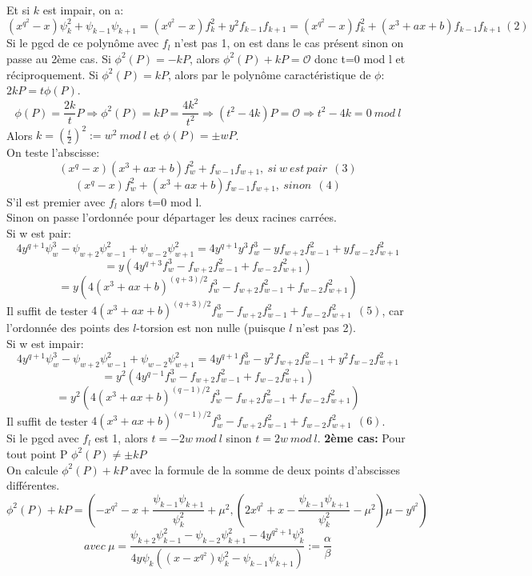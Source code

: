 \documentclass[letterpaper, 12pt]{article}
\begin{document}
Et si $k$ est impair, on a:
$$ (x^{q^2}-x)\psi_{k}^2+\psi_{k-1}\psi_{k+1} = (x^{q^2}-x)f_{k}^2+y^2f_{k-1}f_{k+1} = (x^{q^2}-x)f_{k}^2+(x^3+ax+b)f_{k-1}f_{k+1}\ (2) $$
Si le pgcd de ce polynôme avec $f_{l}$ n'est pas 1, on est dans le cas présent sinon on passe au 2ème cas.
\newline
\newline
Si $\phi^2(P)=-kP$, alors $\phi^2(P)+kP = \mathcal{O}$ donc t=0 mod l et réciproquement.
\newline
\newline
Si $\phi^2(P)=kP$, alors par le polynôme caractéristique de $\phi$: $2kP = t \phi(P).$
$$\phi(P) = \frac{2k}{t}P \Rightarrow \phi^2(P) = kP = \frac{4k^2}{t^2} \Rightarrow (t^2-4k)P = \mathcal{O} \Rightarrow t^2-4k = 0\ mod\ l $$
Alors $k = ( \frac{t}{2} )^2 := w^2\ mod\ l $ et $\phi(P) = \pm wP$.\\
On teste l'abscisse:
$$ (x^{q}-x)(x^3+ax+b)f_{w}^2+f_{w-1}f_{w+1},\ si\ w\ est\ pair\ \ (3) $$
$$ (x^{q}-x)f_{w}^2+(x^3+ax+b)f_{w-1}f_{w+1},\ sinon\ \ (4) $$
S'il est premier avec $f_{l}$ alors t=0 mod l.\\
Sinon on passe l'ordonnée pour départager les deux racines carrées.\\
Si w est pair:
$$ 4y^{q+1}\psi_{w}^3-\psi_{w+2}\psi_{w-1}^2+\psi_{w-2}\psi_{w+1}^2 = 4y^{q+1}y^3 f_{w}^3-yf_{w+2}f_{w-1}^2+yf_{w-2}f_{w+1}^2 $$ $$ = y(4y^{q+3}f_{w}^3-f_{w+2}f_{w-1}^2+f_{w-2}f_{w+1}^2) $$ $$ = y(4(x^3+ax+b)^{(q+3)/2}f_{w}^3-f_{w+2}f_{w-1}^2+f_{w-2}f_{w+1}^2) $$
Il suffit de tester $ 4(x^3+ax+b)^{(q+3)/2}f_{w}^3-f_{w+2}f_{w-1}^2+f_{w-2}f_{w+1}^2\ \ (5) $, car l'ordonnée des points des $l$-torsion est non nulle (puisque $l$ n'est pas 2).\\
Si w est impair:
$$ 4y^{q+1}\psi_{w}^3-\psi_{w+2}\psi_{w-1}^2+\psi_{w-2}\psi_{w+1}^2 = 4y^{q+1}f_{w}^3-y^2f_{w+2}f_{w-1}^2+y^2f_{w-2}f_{w+1}^2 $$ $$ = y^2(4y^{q-1}f_{w}^3-f_{w+2}f_{w-1}^2+f_{w-2}f_{w+1}^2) $$ $$ = y^2(4(x^3+ax+b)^{(q-1)/2}f_{w}^3-f_{w+2}f_{w-1}^2+f_{w-2}f_{w+1}^2) $$
Il suffit de tester $ 4(x^3+ax+b)^{(q-1)/2}f_{w}^3-f_{w+2}f_{w-1}^2+f_{w-2}f_{w+1}^2\ \ (6) $.\\
Si le pgcd avec $f_l$ est 1, alors $ t=-2w\ mod\ l$ sinon $ t=2w\ mod\ l $.
\newline
\newline
\textbf{2ème cas:} Pour tout point P $\phi^2(P) \neq \pm kP$\\
On calcule $\phi^2(P)+kP$ avec la formule de la somme de deux points d'abscisses différentes.
$$ \phi^2(P)+kP = \left(-x^{q^2}-x+\frac{\psi_{k-1}\psi_{k+1}}{\psi_{k}^2}+\mu^2, \left(2x^{q^2}+x-\frac{\psi_{k-1}\psi_{k+1}}{\psi_{k}^2}-\mu^2\right)\mu-y^{q^2}\right) $$ $$ avec\ \mu=\frac{\psi_{k+2}\psi_{k-1}^2-\psi_{k-2}\psi_{k+1}^2-4y^{q^2+1}\psi_{k}^3}{4y\psi_{k}((x-x^{q^2})\psi_{k}^2-\psi_{k-1}\psi_{k+1})} := \frac{\alpha}{\beta} $$
\end{document}
